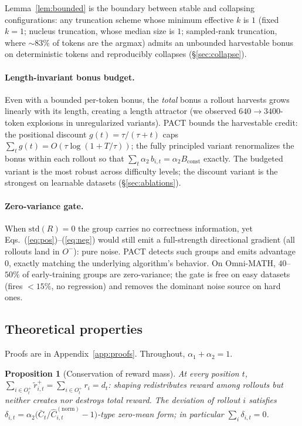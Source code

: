 \documentclass{article} %
\theoremstyle{plain}
\newtheorem{proposition}[theorem]{Proposition}
\theoremstyle{definition}
\theoremstyle{remark}
\newcommand{\method}{PACT}
\begin{document}
Lemma~\ref{lem:bounded} is the boundary between stable and collapsing configurations: any truncation scheme whose minimum effective $k$ is $1$ (fixed $k{=}1$; nucleus truncation, whose median size is $1$; sampled-rank truncation, where ${\sim}83\%$ of tokens are the argmax) admits an unbounded harvestable bonus on deterministic tokens and reproducibly collapses (\S\ref{sec:collapse}).

\paragraph{Length-invariant bonus budget.} Even with a bounded per-token bonus, the \emph{total} bonus a rollout harvests grows linearly with its length, creating a length attractor (we observed $640\to3400$-token explosions in unregularized variants). \method{} bounds the harvestable credit: the positional discount $g(t)=\tau/(\tau+t)$ caps $\sum_t g(t) = O(\tau\log(1+T/\tau))$; the fully principled variant renormalizes the bonus within each rollout so that $\sum_t \alpha_2\,b_{i,t} = \alpha_2 B_\mathrm{const}$ exactly. The budgeted variant is the most robust across difficulty levels; the discount variant is the strongest on learnable datasets (\S\ref{sec:ablations}).

\paragraph{Zero-variance gate.} When $\mathrm{std}(R)=0$ the group carries no correctness information, yet Eqs.~(\ref{eq:pos})--(\ref{eq:neg}) would still emit a full-strength directional gradient (all rollouts land in $O^-$): pure noise. \method{} detects such groups and emits advantage $0$, exactly matching the underlying algorithm's behavior. On Omni-MATH, $40$--$50\%$ of early-training groups are zero-variance; the gate is free on easy datasets (fires ${<}15\%$, no regression) and removes the dominant noise source on hard ones.

\subsection{Theoretical properties}
\label{sec:theory}

Proofs are in Appendix~\ref{app:proofs}. Throughout, $\alpha_1+\alpha_2=1$.

\begin{proposition}[Conservation of reward mass]
\label{prop:conserve}
At every position $t$, $\sum_{i\in O^+_t} \tilde r^+_{i,t} = \sum_{i\in O^+_t} r_i = d_t$: shaping redistributes reward among rollouts but neither creates nor destroys total reward. The deviation of rollout $i$ satisfies $\delta_{i,t} = \alpha_2\big(\bar C_t / \hat C_{i,t}^{\mathrm{(norm)}} - 1\big)$-type zero-mean form; in particular $\sum_{i} \delta_{i,t} = 0$.
\end{proposition}
\end{document}
